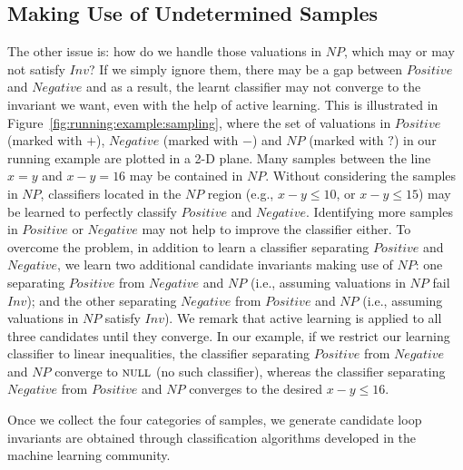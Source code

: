 \subsection{Making Use of Undetermined Samples}
The other issue is: how do we handle those valuations in $NP$, which may or may not satisfy $Inv$? If we simply ignore them, there may be a gap between $Positive$ and $Negative$ and as a result, the learnt classifier may not converge to the invariant we want, even with the help of active learning.
This is illustrated in Figure~\ref{fig:running:example:sampling}, where the set of valuations in $Positive$ (marked with $+$), $Negative$ (marked with $-$) and $NP$ (marked with $?$) in our running example are plotted in a 2-D plane. Many samples between the line $x=y$ and $x-y=16$ may be contained in $NP$. Without considering the samples in $NP$, classifiers located in the $NP$ region (e.g., $x - y \leq 10$, or $x - y \leq 15$) may be learned to perfectly classify $Positive$ and $Negative$. Identifying more samples in $Positive$ or $Negative$ may not help to improve the classifier either. To overcome the problem, in addition to learn a classifier separating $Positive$ and $Negative$, we learn two additional candidate invariants making use of $NP$:
one separating $Positive$ from $Negative$ and $NP$ (i.e., assuming valuations in $NP$ fail $Inv$);
and the other separating $Negative$ from $Positive$ and $NP$ (i.e., assuming valuations in $NP$ satisfy $Inv$).
We remark that active learning is applied to all three candidates until they converge.
In our example, if we restrict our learning classifier to linear inequalities, the classifier separating $Positive$ from $Negative$ and $NP$ converge to $\textsc{null}$ (no such classifier), whereas the classifier separating $Negative$ from $Positive$ and $NP$ converges to the desired $x - y \leq 16$.

Once we collect the four categories of samples, we generate candidate loop invariants are obtained through classification algorithms developed in the machine learning community.

